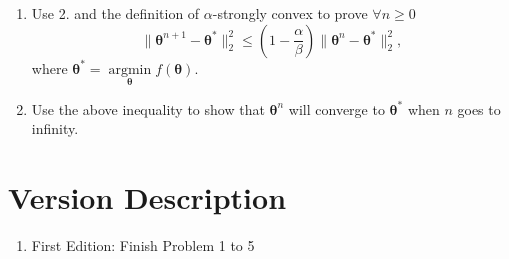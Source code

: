 \documentclass{article}
\begin{document}
\begin{enumerate}
 \item Use 2. and the definition of $\alpha$-strongly convex to prove $\forall n \geq 0$
 $$ \lVert \boldsymbol{\theta}^{n+1} - \boldsymbol{\theta}^{*} \rVert_2^2 \leq (1- \frac{\alpha}{\beta}) \lVert \boldsymbol{\theta}^{n} - \boldsymbol{\theta}^{*} \rVert_2^2, $$ where $\boldsymbol{\theta}^{*} = \mathop{\arg\min}\limits_{\boldsymbol{\theta}} f(\boldsymbol{\theta})$.\\
 \item Use the above inequality to show that $\boldsymbol{\theta}^n$ will converge to $\boldsymbol{\theta}^*$ when $n$ goes to infinity.
 \end{enumerate}

 \section*{Version Description}
 \begin{enumerate}
     \item First Edition: Finish Problem 1 to 5
 \end{enumerate}
\end{document}
